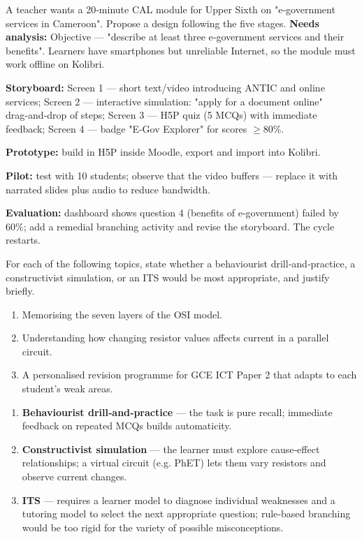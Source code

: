 \documentclass[11pt]{article}
\begin{document}
\begin{exoresolu}
A teacher wants a 20‑minute CAL module for Upper Sixth on "e‑government services in Cameroon". Propose a design following the five stages.
\tcblower
\textbf{Needs analysis:} Objective — "describe at least three e‑government services and their benefits". Learners have smartphones but unreliable Internet, so the module must work offline on Kolibri.

\textbf{Storyboard:} Screen 1 — short text/video introducing ANTIC and online services; Screen 2 — interactive simulation: "apply for a document online" drag‑and‑drop of steps; Screen 3 — H5P quiz (5 MCQs) with immediate feedback; Screen 4 — badge "E‑Gov Explorer" for scores $\geq 80\%$.

\textbf{Prototype:} build in H5P inside Moodle, export and import into Kolibri.

\textbf{Pilot:} test with 10 students; observe that the video buffers — replace it with narrated slides plus audio to reduce bandwidth.

\textbf{Evaluation:} dashboard shows question 4 (benefits of e‑government) failed by $60\%$; add a remedial branching activity and revise the storyboard. The cycle restarts.
\end{exoresolu}

\begin{exoresolu}
For each of the following topics, state whether a behaviourist drill‑and‑practice, a constructivist simulation, or an ITS would be most appropriate, and justify briefly.
\begin{enumerate}
\item Memorising the seven layers of the OSI model.
\item Understanding how changing resistor values affects current in a parallel circuit.
\item A personalised revision programme for GCE ICT Paper 2 that adapts to each student's weak areas.
\end{enumerate}
\tcblower
\begin{enumerate}
\item \textbf{Behaviourist drill‑and‑practice} — the task is pure recall; immediate feedback on repeated MCQs builds automaticity.
\item \textbf{Constructivist simulation} — the learner must explore cause‑effect relationships; a virtual circuit (e.g. PhET) lets them vary resistors and observe current changes.
\item \textbf{ITS} — requires a learner model to diagnose individual weaknesses and a tutoring model to select the next appropriate question; rule‑based branching would be too rigid for the variety of possible misconceptions.
\end{enumerate}
\end{exoresolu}
\end{document}
